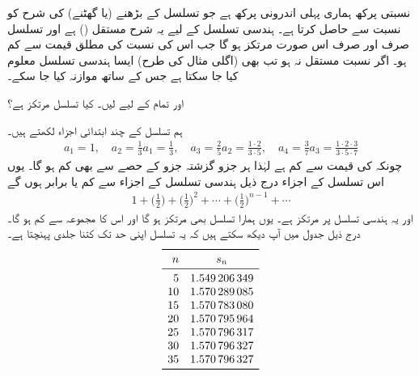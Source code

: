 نسبتی پرکھ ہماری پہلی  اندرونی پرکھ ہے جو تسلسل کے بڑھنے (یا گھٹنے) کی شرح کو نسبت  سے حاصل کرتا ہے۔ ہندسی تسلسل  کے لیے یہ شرح مستقل () ہے اور تسلسل صرف اور صرف اس صورت مرتکز ہو گا جب اس کی  نسبت کی مطلق قیمت  سے کم ہو۔ اگر نسبت مستقل نہ ہو تب بھی (اگلی مثال کی طرح) ایسا ہندسی تسلسل معلوم کیا جا سکتا ہے جس کے ساتھ موازنہ کیا جا سکے۔

 اور تمام  کے لیے  لیں۔ کیا تسلسل  مرتکز ہے؟

ہم تسلسل کے چند ابتدائی اجزاء لکھتے ہیں۔
\begin{align*}
a_1=1,\quad a_2=\frac{1}{3}a_1=\frac{1}{3},\quad a_3=\frac{2}{5}a_2=\frac{1\cdot 2}{3\cdot 5},\quad a_4=\frac{3}{7}a_3=\frac{1\cdot 2\cdot 3}{3\cdot 5\cdot 7}
\end{align*}
چونکہ  کی قیمت  سے کم ہے لہٰذا ہر جزو گزشتہ جزو کے   حصے سے بھی کم ہو گا۔ یوں اس  تسلسل کے اجزاء درج ذیل ہندسی تسلسل کے اجزاء سے کم یا برابر ہوں گے
\begin{align*}
1+\big(\frac{1}{2}\big)+\big(\frac{1}{2}\big)^2+\cdots+\big(\frac{1}{2}\big)^{n-1}+\cdots
\end{align*}
 اور یہ ہندسی تسلسل  پر مرتکز ہے۔ یوں ہمارا تسلسل بھی مرتکز ہو گا اور اس کا مجموعہ  سے کم ہو گا۔درج ذیل جدول میں آپ دیکھ سکتے ہیں کہ یہ تسلسل اپنی  حد  تک کتنا جلدی پہنچتا ہے۔
\begin{align*}
\begin{array}{rc}
\toprule
n&s_n\\
\midrule
5&\num{1.549206349}\\
10&\num{1.570289085}\\
15&\num{1.570783080}\\
20&\num{1.570795964}\\
25&\num{1.570796317}\\
30&\num{1.570796327}\\
35&\num{1.570796327}\\
\bottomrule
\end{array}
\end{align*}

